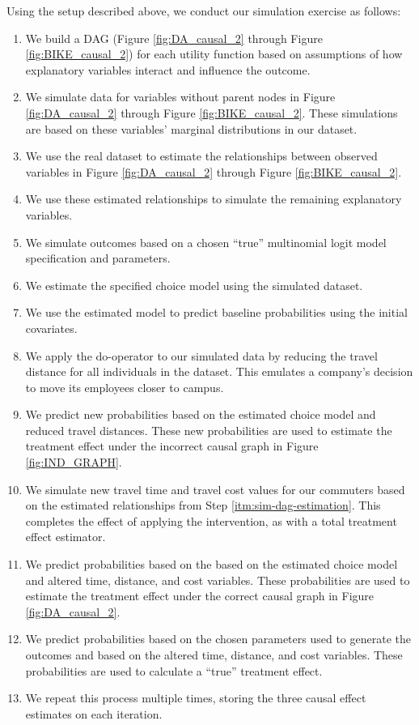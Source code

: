 Using the setup described above, we conduct our simulation exercise as follows:
\begin{enumerate}

   \item We build a DAG (Figure \ref{fig:DA_causal_2} through Figure \ref{fig:BIKE_causal_2}) for each utility function based on assumptions of how explanatory variables interact and influence the outcome.
   \item We simulate data for variables without parent nodes in Figure \ref{fig:DA_causal_2} through Figure \ref{fig:BIKE_causal_2}.
   These simulations are based on these variables' marginal distributions in our dataset.
   \item We use the real dataset to estimate the relationships between observed variables in Figure \ref{fig:DA_causal_2} through Figure \ref{fig:BIKE_causal_2}.
      \label{itm:sim-dag-estimation}
   \item We use these estimated relationships to simulate the remaining explanatory variables.
   \item We simulate outcomes based on a chosen ``true'' multinomial logit model specification and parameters.
   \item We estimate the specified choice model using the simulated dataset.
   \item We use the estimated model to predict baseline probabilities using the initial covariates.
   \item We apply the do-operator \citet{pearl_causality_2000} to our simulated data by reducing the travel distance for all individuals in the dataset.
   This emulates a company's decision to move its employees closer to campus.
   \item We predict new probabilities based on the estimated choice model and reduced travel distances.
   These new probabilities are used to estimate the treatment effect under the incorrect causal graph in Figure \ref{fig:IND_GRAPH}.
   \item We simulate new travel time and travel cost values for our commuters based on the estimated relationships from Step \ref{itm:sim-dag-estimation}.
   This completes the effect of applying the intervention, as with a total treatment effect estimator.
   \item We predict probabilities based on the based on the estimated choice model and altered time, distance, and cost variables.
   These probabilities are used to estimate the treatment effect under the correct causal graph in Figure \ref{fig:DA_causal_2}.
   \item We predict probabilities based on the chosen parameters used to generate the outcomes and based on the altered time, distance, and cost variables.
   These probabilities are used to calculate a ``true'' treatment effect.
   \item We repeat this process multiple times, storing the three causal effect estimates on each iteration.

\end{enumerate}

